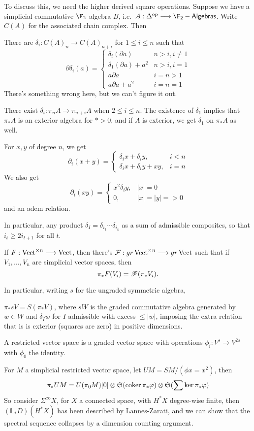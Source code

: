 \begin{RuneBabytop}
To discuss this, we need the higher derived square operations. Suppose we have a simplicial commutative $\F_2$-algebra $B$, i.e.\ $A:\Delta^\op\to\mathsf{\F_2-Algebras}$. Write $C(A)$ for the associated chain complex. Then
\begin{prop*}
There are $\delta_i:C(A)_n\to C(A)_{n+i}$ for $1\leq i\leq n$ such that
\[\partial\delta_i(a)=\begin{cases}
\delta_i(\partial a)&n>i,i\neq1\\
\delta_1(\partial a)+a^2&n>i,i=1\\
a\partial a&i=n>1\\
a\partial a+a^2&i=n=1
\end{cases}\]
There's something wrong here, but we can't figure it out.
\end{prop*}
\begin{cor*}
There exist $\delta_i:\pi_n A\to \pi_{n+i} A$ when $2\leq i\leq n$. The existence of $\delta_1$ implies that $\pi_*A$ is an exterior algebra for $*>0$, and if $A$ is exterior, we get $\delta_1$ on $\pi_*A$ as well.
\end{cor*}
\begin{thm*}
For $x,y$ of degree $n$, we get
\[\partial_i(x+y)=\begin{cases}\delta_i x+\delta_i y,&i<n\\\delta_i x+\delta_i y+xy,&i=n\end{cases}\]
We also get
\[\partial_i(xy)=\begin{cases}x^2\delta_i y,&|x|=0\\0,&|x|=|y|=>0\end{cases}\]
and an adem relation.
\end{thm*}
In particular, any product $\delta_I=\delta_{i_1}\cdots\delta_{i_k}$ as a sum of admissible composites, so that $i_t\geq2i_{t+1}$ for all $t$.
\begin{thm*}[Dold]
If $F:\operatorname{Vect}^{\times n}\longrightarrow\operatorname{Vect}$, then there's $\mathcal{F}:gr\operatorname{Vect}^{\times n}\longrightarrow gr\operatorname{Vect}$ such that if $V_1,\ldots, V_n$ are simplicial vector spaces, then
\[\pi_*F(V_i)=\mathscr{F}(\pi_*V_i).\]
\end{thm*}
In particular, writing $s$ for the ungraded symmetric algebra,
\begin{thm*}
$\pi_*sV=S(\pi_*V)$, where $sW$ is the graded commutative algebra generated by $w\in W$ and $\delta_Iw$ for $I$ admissible with excess $\leq |w|$, imposing the extra relation that is is exterior (squares are zero) in positive dimensions.
\end{thm*}
\begin{defn*}
A restricted vector space is a graded vector space with operations $\phi_i:V^s\to V^{2s}$ with $\phi_0$ the identity.
\end{defn*}
\begin{prop*}
For $M$ a simplicial restricted vector space, let $UM=SM/(\phi x=x^2)$, then
\[\pi_*UM=U(\pi_0M)[0]\otimes\mathfrak{S}(\operatorname{coker}\pi_*\varphi)\otimes\mathfrak{S}(\sum\textup{ker}\,\pi_*\varphi)\]
So consider $\Sigma^\infty X$, for $X$ a connected space, with $H^*X$ degree-wise finite, then $(\mathbb{L}_*D)(H^*X)$ has been described by Lannes-Zarati, and we can show that the spectral sequence collapses by a dimension counting argument.
\end{prop*}


\end{RuneBabytop}
